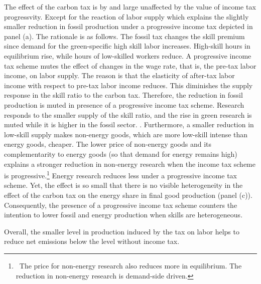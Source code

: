  
  The effect of the carbon tax is by and large unaffected by the value of income tax progressvity.
   Except for the reaction of labor supply which explains the slightly smaller reduction in fossil production under a progressive income tax depicted in panel (a). The rationale is as follows.
    The fossil tax changes the skill premium since demand for the green-specific high skill labor increases. High-skill hours in equilibrium rise, while hours of low-skilled workers reduce.  A progressive income tax scheme mutes the effect of changes in the wage rate, that is, the pre-tax labor income, on labor supply. The reason is that the elasticity of after-tax labor income with respect to pre-tax labor income reduces. This diminishes the supply response in the skill ratio to the carbon tax. Therefore, the reduction in fossil production is muted in presence of a progressive income tax scheme. Research responds to the smaller supply of the skill ratio, and the rise in green research is muted while it is higher in the fossil sector.  . Furthermore, a smaller reduction in low-skill supply makes non-energy goods, which are more low-skill intense than energy goods, cheaper. The lower price of non-energy goods and its complementarity to energy goods (so that demand for energy remains high) explains a stronger reduction in non-energy research when the income tax scheme is progressive.\footnote{\ The price for non-energy research also reduces more in equilibrium. The reduction in non-energy research is demand-side driven.} Energy research reduces less under a progressive income tax scheme. Yet, the effect is so small that there is no visible heterogeneity in the effect of the carbon tax on the energy share in final good production (panel (c)). Consequently, the presence of a progressive income tax scheme counters the intention to lower fossil and energy production when skills are heterogeneous.
   
Overall, the smaller level in production induced by the tax on labor helps to reduce net emissions below the level without income tax.
 
